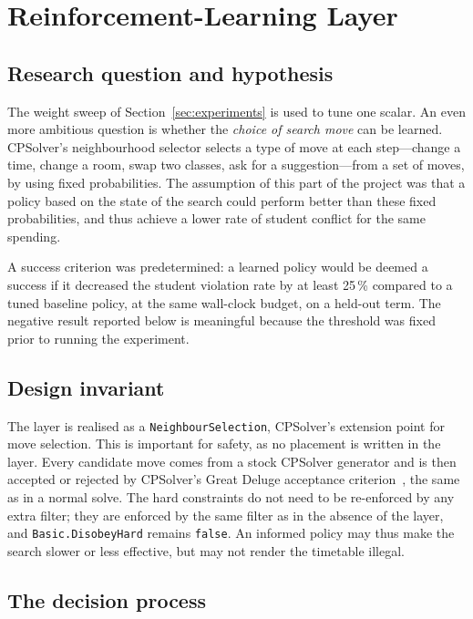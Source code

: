 \section{Reinforcement-Learning Layer}
\label{sec:rl}

\subsection{Research question and hypothesis}

The weight sweep of Section~\ref{sec:experiments} is used to tune one scalar. An even more
ambitious question is whether the \emph{choice of search move} can be learned. CPSolver's
neighbourhood selector selects a type of move at each step---change a time, change a room, swap
two classes, ask for a suggestion---from a set of moves, by using fixed probabilities. The
assumption of this part of the project was that a policy based on the state of the search could
perform better than these fixed probabilities, and thus achieve a lower rate of student conflict
for the same spending.

A success criterion was predetermined: a learned policy would be deemed a success if it decreased
the student violation rate by at least 25\,\% compared to a tuned baseline policy, at the same
wall-clock budget, on a held-out term. The negative result reported below is meaningful because
the threshold was fixed prior to running the experiment.

\subsection{Design invariant}

The layer is realised as a \texttt{NeighbourSelection}, CPSolver's extension point for move
selection. This is important for safety, as no placement is written in the layer. Every candidate
move comes from a stock CPSolver generator and is then accepted or rejected by CPSolver's Great
Deluge acceptance criterion~\cite{dueck1993deluge}, the same as in a normal solve. The hard
constraints do not need to be re-enforced by any extra filter; they are enforced by the same
filter as in the absence of the layer, and \texttt{Basic.DisobeyHard} remains \texttt{false}. An
informed policy may thus make the search slower or less effective, but may not render the
timetable illegal.

\subsection{The decision process}

